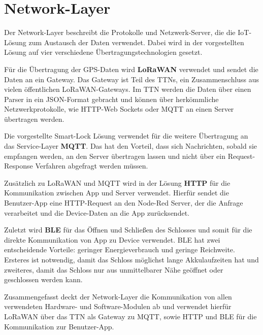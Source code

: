 
\section{Network-Layer} \label{network}
Der Network-Layer beschreibt die Protokolle und Netzwerk-Server, die die \ac{IoT}-Lösung zum Austausch der Daten verwendet. Dabei wird in der vorgestellten Lösung auf vier verschiedene Übertragungstechnologien gesetzt.

Für die Übertragung der \ac{GPS}-Daten wird \textbf{\ac{LoRaWAN}} verwendet und sendet die Daten an ein Gateway. Das Gateway ist Teil des \ac{TTN}s, ein Zusammenschluss aus vielen öffentlichen \ac{LoRaWAN}-Gateways. Im \ac{TTN} werden die Daten über einen Parser in ein \ac{JSON}-Format gebracht und können über herkömmliche Netzwerkprotokolle, wie \ac{HTTP}-Web Sockets oder \ac{MQTT} an einen Server übertragen werden.

Die vorgestellte Smart-Lock Lösung verwendet für die weitere Übertragung an das Service-Layer \textbf{\ac{MQTT}}. Das hat den Vorteil, dass sich Nachrichten, sobald sie empfangen werden, an den Server übertragen lassen und nicht über ein Request-Response Verfahren abgefragt werden müssen. 

Zusätzlich zu \ac{LoRaWAN} und \ac{MQTT} wird in der Lösung \textbf{\ac{HTTP}} für die Kommunikation zwischen App und Server verwendet. Hierfür sendet die Benutzer-App eine \ac{HTTP}-Request an den Node-Red Server, der die Anfrage verarbeitet und die Device-Daten an die App zurücksendet. 

Zuletzt wird \textbf{\ac{BLE}} für das Öffnen und Schließen des Schlosses und somit für die direkte Kommunikation von App zu Device verwendet. \ac{BLE} hat zwei entscheidende Vorteile: geringer Energieverbrauch und geringe Reichweite. Ersteres ist notwendig, damit das Schloss möglichst lange Akkulaufzeiten hat und zweiteres, damit das Schloss nur aus unmittelbarer Nähe geöffnet oder geschlossen werden kann.

Zusammengefasst deckt der Network-Layer die Kommunikation von allen verwendeten Hardware- und Software-Modulen ab und verwendet hierfür \ac{LoRaWAN} über das \ac{TTN} als Gateway zu \ac{MQTT}, sowie \ac{HTTP} und \ac{BLE} für die Kommunikation zur Benutzer-App.